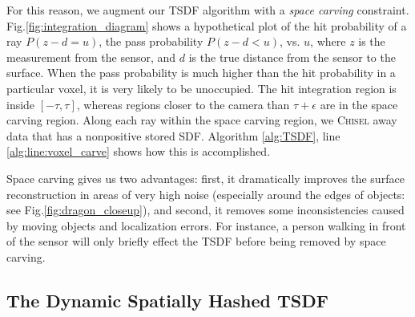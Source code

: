 \documentclass[conference]{IEEEtran}
\newcommand{\figref}[1]{Fig.\ref{#1}}
\newcommand{\chisel}{\textsc{Chisel}\xspace}
\begin{document}
For this reason, we augment our TSDF algorithm with a \textit{space carving}
\cite{Elfes1989} constraint.   \figref{fig:integration_diagram} shows a hypothetical
plot of the hit probability of a ray $P\left(z - d = u \right) $, the pass probability
$P\left(z - d < u\right)$, vs. $u$, where $z$ is the measurement from the
sensor, and $d$ is the true distance from the sensor to the surface. When the
pass probability is much higher than the hit probability in a particular voxel,
it is very likely to be unoccupied. The hit integration region is inside
$[-\tau, \tau]$, whereas regions closer to the camera than  $\tau + \epsilon$
are in the space carving region. Along each ray within the space carving region,
we \chisel away data that has a nonpositive stored SDF. Algorithm
\ref{alg:TSDF}, line \ref{alg:line:voxel_carve} shows how this is
accomplished.

Space carving gives us two advantages: first, it dramatically improves the
surface reconstruction in areas of very high noise (especially around the edges
of objects: see \figref{fig:dragon_closeup}), and second, it removes
some inconsistencies caused by moving objects and localization errors. For
instance, a person walking in front of the sensor will only briefly effect the
TSDF before being removed by space carving.
 
\subsection{The Dynamic Spatially Hashed TSDF}
\label{section:spatialhash}
\end{document}
